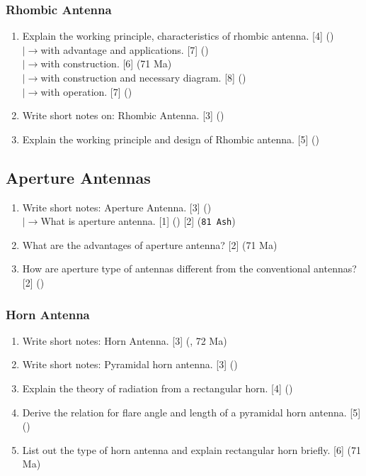 \documentclass[12pt]{article}
\newcommand{\lb}{\\$\left|\rightarrow\right.$}
\begin{document}
    \subsubsection{Rhombic Antenna}
      \begin{enumerate}
        \item Explain the working principle, characteristics of rhombic antenna. \hfill [4] ()
          \lb with advantage and applications. \hfill [7] ()
          \lb with construction. \hfill [6] (71 Ma)
          \lb with construction and necessary diagram. \hfill [8] ()
          \lb with operation. \hfill [7] ()

        \item Write short notes on: Rhombic Antenna. \hfill [3] ()

        \item Explain the working principle and design of Rhombic antenna. \hfill [5] ()
      \end{enumerate}

  \subsection{Aperture Antennas}
    \begin{enumerate}
      \item Write short notes: Aperture Antenna. \hfill [3] ()
        \lb What is aperture antenna. \hfill [1] () [2] (\texttt{81 Ash})

      \item What are the advantages of aperture antenna? \hfill [2] (71 Ma)

      \item How are aperture type of antennas different from the conventional antennas? \hfill [2] ()
    \end{enumerate}

    \subsubsection{Horn Antenna}
      \begin{enumerate}
        \item Write short notes: Horn Antenna. \hfill [3] (, 72 Ma)
        
        \item Write short notes: Pyramidal horn antenna. \hfill [3] ()

        \item Explain the theory of radiation from a rectangular horn. \hfill [4] ()

        \item Derive the relation for flare angle and length of a pyramidal horn antenna. \hfill [5] ()

        \item List out the type of horn antenna and explain rectangular horn briefly. \hfill [6] (71 Ma)
      \end{enumerate}
\end{document}
